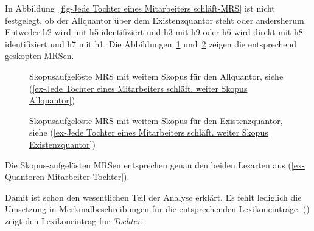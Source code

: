 In Abbildung~\ref{fig-Jede Tochter eines Mitarbeiters
  schläft-MRS} ist nicht festgelegt, ob der Allquantor über dem Existenzquantor steht oder
andersherum. Entweder h2 wird mit h5
identifiziert und h3 mit h9 oder h6 wird direkt mit h8 identifiziert und h7 mit h1. Die Abbildungen~\ref{fig-Jede-Tochter-eines-Mitarbeiters-schläft-Allquantor} und~\ref{fig-Jede-Tochter-eines-Mitarbeiters-schläft-Existenzquantor} zeigen die entsprechend geskopten MRSen.
\begin{figure}
\caption{Skopusaufgelöste MRS mit weitem Skopus für den Allquantor, siehe (\ref{ex-Jede Tochter eines Mitarbeiters schläft. weiter Skopus Allquantor})}\label{fig-Jede-Tochter-eines-Mitarbeiters-schläft-Allquantor}
\end{figure}
\begin{figure}
\caption{Skopusaufgelöste MRS mit weitem Skopus für den Existenzquantor, siehe (\ref{ex-Jede Tochter eines Mitarbeiters schläft. weiter Skopus Existenzquantor})}\label{fig-Jede-Tochter-eines-Mitarbeiters-schläft-Existenzquantor}
\end{figure}
Die Skopus-aufgelösten MRSen entsprechen genau den beiden Lesarten aus (\ref{ex-Quantoren-Mitarbeiter-Tochter}).

Damit ist schon den wesentlichen Teil der Analyse erklärt. Es fehlt lediglich die Umsetzung
in Merkmalbeschreibungen für die entsprechenden Lexikoneinträge. 
() zeigt den Lexikoneintrag für \emph{Tochter}:

